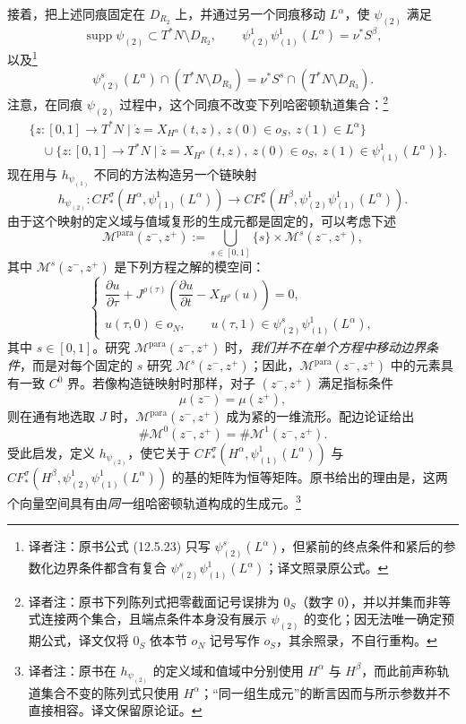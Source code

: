 接着，把上述同痕固定在 $D_{R_2}$ 上，并通过另一个同痕移动 $L^\alpha$，使 $\psi_{(2)}$ 满足
\[
  \operatorname{supp}\psi_{(2)}\subset T^*N\setminus D_{R_2},
  \qquad
  \psi_{(2)}^1\psi_{(1)}^1(L^\alpha)=\nu^*S^\beta,
\]
以及\footnote{译者注：原书公式 (12.5.23) 只写 $\psi_{(2)}^s(L^\alpha)$，但紧前的终点条件和紧后的参数化边界条件都含有复合 $\psi_{(2)}^s\psi_{(1)}^1(L^\alpha)$；译文照录原公式。}
\begin{equation}
  \psi_{(2)}^s(L^\alpha)\cap(T^*N\setminus D_{R_3})
  =\nu^*S^s\cap(T^*N\setminus D_{R_3}).
\label{eq:second-isotopy-outside-disc}
\end{equation}
注意，在同痕 $\psi_{(2)}$ 过程中，这个同痕不改变下列哈密顿轨道集合：\footnote{译者注：原书下列陈列式把零截面记号误排为 $0_S$（数字 $0$），并以并集而非等式连接两个集合，且端点条件本身没有展示 $\psi_{(2)}$ 的变化；因无法唯一确定预期公式，译文仅将 $0_S$ 依本节 $o_N$ 记号写作 $o_S$，其余照录，不自行重构。}
\[
\begin{split}
  &\{z:[0,1]\to T^*N\mid
    \dot z=X_{H^\alpha}(t,z),\ z(0)\in o_S,\ z(1)\in L^\alpha\}\\
  &\quad\cup
  \{z:[0,1]\to T^*N\mid
    \dot z=X_{H^\alpha}(t,z),\ z(0)\in o_S,\
    z(1)\in\psi_{(1)}^1(L^\alpha)\}.
\end{split}
\]
现在用与 $h_{\psi_{(1)}}$ 不同的方法构造另一个链映射
\[
  h_{\psi_{(2)}}:
  CF_*^\sigma(H^\alpha,\psi_{(1)}^1(L^\alpha))
  \longrightarrow
  CF_*^\sigma(H^\beta,\psi_{(2)}^1\psi_{(1)}^1(L^\alpha)).
\]
由于这个映射的定义域与值域复形的生成元都是固定的，可以考虑下述\emph{\termParameterizedModuliSpace{}}
\begin{equation}
  \mathcal M^{\mathrm{para}}(z^-,z^+)
  :=\bigcup_{s\in[0,1]}\{s\}\times\mathcal M^s(z^-,z^+),
\label{eq:parameterized-moduli-second-isotopy}
\end{equation}
其中 $\mathcal M^s(z^-,z^+)$ 是下列方程之解的模空间：
\[
  \begin{cases}
    \dfrac{\partial u}{\partial\tau}
    +J^{\rho(\tau)}\left(
      \dfrac{\partial u}{\partial t}-X_{H^\rho}(u)
    \right)=0,\\[6pt]
    u(\tau,0)\in o_N,
    \qquad
    u(\tau,1)\in\psi_{(2)}^s\psi_{(1)}^1(L^\alpha),
  \end{cases}
\]
其中 $s\in[0,1]$。研究 $\mathcal M^{\mathrm{para}}(z^-,z^+)$ 时，\emph{我们并不在单个方程中移动边界条件}，而是对每个固定的 $s$ 研究 $\mathcal M^s(z^-,z^+)$；因此，$\mathcal M^{\mathrm{para}}(z^-,z^+)$ 中的元素具有一致 $C^0$ 界。若像构造链映射时那样，对子 $(z^-,z^+)$ 满足指标条件
\[
  \mu(z^-)=\mu(z^+),
\]
则在通有地选取 $J$ 时，$\mathcal M^{\mathrm{para}}(z^-,z^+)$ 成为紧的一维流形。配边论证给出
\[
  \#\mathcal M^0(z^-,z^+)=\#\mathcal M^1(z^-,z^+).
\]
受此启发，定义 $h_{\psi_{(2)}}$，使它关于 $CF_*^\sigma(H^\alpha,\psi_{(1)}^1(L^\alpha))$ 与 $CF_*^\sigma(H^\beta,\psi_{(2)}^1\psi_{(1)}^1(L^\alpha))$ 的基的矩阵为恒等矩阵。原书给出的理由是，这两个向量空间具有由\emph{同一}组哈密顿轨道构成的生成元。\footnote{译者注：原书在 $h_{\psi_{(2)}}$ 的定义域和值域中分别使用 $H^\alpha$ 与 $H^\beta$，而此前声称轨道集合不变的陈列式只使用 $H^\alpha$；“同一组生成元”的断言因而与所示参数并不直接相容。译文保留原论证。}

